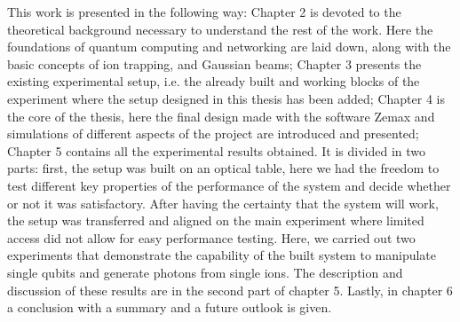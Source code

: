 \documentclass[english, a4paper, 12pt, twoside]{book}
\numberwithin{equation}{section} %
\begin{document}
This work is presented in the following way: Chapter 2 is devoted to the theoretical background necessary to understand the rest of the work. Here the foundations of quantum computing and networking are laid down, along with the basic concepts of ion trapping, and Gaussian beams; Chapter 3 presents the existing experimental setup, i.e. the already built and working blocks of the experiment where the setup designed in this thesis has been added; Chapter 4 is the core of the thesis, here the final design made with the software Zemax and simulations of different aspects of the project are introduced and presented;
Chapter 5 contains all the experimental results obtained. It is divided in two parts: first, the setup was built on an optical table, here we had the freedom to test different key properties of the performance of the system and decide whether or not it was satisfactory. After having the certainty that the system will work, the setup was transferred and aligned on the main experiment where limited access did not allow for easy performance testing. Here, we carried out two experiments that demonstrate the capability of the built system to manipulate single qubits and generate photons from single ions. The description and discussion of these results are in the second part of chapter 5. Lastly, in chapter 6 a conclusion with a summary and a future outlook is given.













\newpage




\newpage
\renewcommand{\appendixpagename}{Appendix} %
\renewcommand{\appendixtocname}{Appendix} %
\addappheadtotoc
\end{document}
